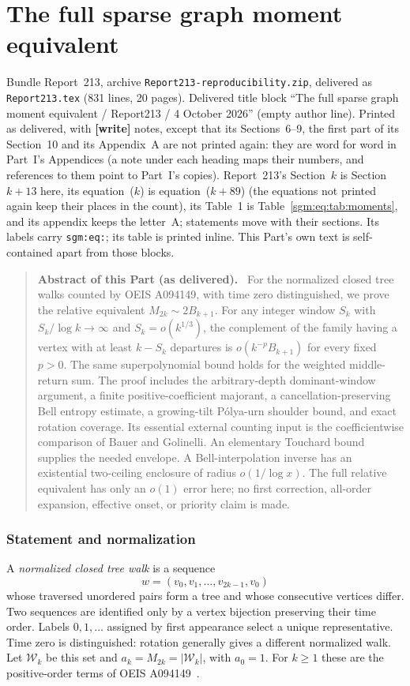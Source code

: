 \documentclass[11pt,letterpaper]{article}
\theoremstyle{remark}\newtheorem{remark}[theorem]{Remark}
\newcommand{\Wc}{\mathcal W}\newcommand{\Uc}{\mathcal U}\newcommand{\Part}{\operatorname{Part}}
\newcommand{\file}[1]{\nolinkurl{#1}}
\newenvironment{partabstract}{\begin{quote}\small\noindent\textbf{Abstract of this Part (as delivered).}\ }{\end{quote}}
\newcommand{\partsource}[1]{\par\noindent\begin{minipage}{\textwidth}\small #1\end{minipage}\par\medskip}
\theoremstyle{definition}\newtheorem{definition}[theorem]{Definition}
\begin{document}
\part{The full sparse graph moment equivalent}\label{sgm:eq:part}
\setcounter{section}{13}
\partsource{Bundle Report~213, archive \file{Report213-reproducibility.zip}, delivered as \file{Report213.tex} (831 lines, 20 pages). Delivered title block ``The full sparse graph moment equivalent / Report213 / 4 October 2026'' (empty author line). Printed as delivered, with \textbf{[write]} notes, except that its Sections~6--9, the first part of its Section~10 and its Appendix~A are not printed again: they are word for word in Part~I's Appendices (a note under each heading maps their numbers, and references to them point to Part~I's copies). Report~213's Section~$k$ is Section~$k+13$ here, its equation~($k$) is equation~($k+89$) (the equations not printed again keep their places in the count), its Table~1 is Table~\ref{sgm:eq:tab:moments}, and its appendix keeps the letter~A; statements move with their sections. Its labels carry \file{sgm:eq:}; its table is printed inline. This Part's own text is self-contained apart from those blocks.}
\begin{partabstract}
For the normalized closed tree walks counted by OEIS A094149, with time zero distinguished, we prove the relative equivalent $M_{2k}\sim2B_{k+1}$. For any integer window $S_k$ with $S_k/\log k\to\infty$ and $S_k=o(k^{1/3})$, the complement of the family having a vertex with at least $k-S_k$ departures is $o(k^{-p}B_{k+1})$ for every fixed $p>0$. The same superpolynomial bound holds for the weighted middle-return sum. The proof includes the arbitrary-depth dominant-window argument, a finite positive-coefficient majorant, a cancellation-preserving Bell entropy estimate, a growing-tilt P\'olya-urn shoulder bound, and exact rotation coverage. Its essential external counting input is the coefficientwise comparison of Bauer and Golinelli. An elementary Touchard bound supplies the needed envelope. A Bell-interpolation inverse has an existential two-ceiling enclosure of radius $o(1/\log x)$. The full relative equivalent has only an $o(1)$ error here; no first correction, all-order expansion, effective onset, or priority claim is made.
\end{partabstract}

\section{Statement and normalization}\label{sgm:eq:sec:main}
A \emph{normalized closed tree walk} is a sequence
\[
 w=(v_0,v_1,\ldots,v_{2k-1},v_0)
\]
whose traversed unordered pairs form a tree and whose consecutive vertices differ. Two sequences are identified only by a vertex bijection preserving their time order. Labels $0,1,\ldots$ assigned by first appearance select a unique representative. Time zero is distinguished: rotation generally gives a different normalized walk. Let $\Wc_k$ be this set and $a_k=M_{2k}=|\Wc_k|$, with $a_0=1$. For $k\ge1$ these are the positive-order terms of OEIS A094149~\cite{oeis}.
\end{document}
